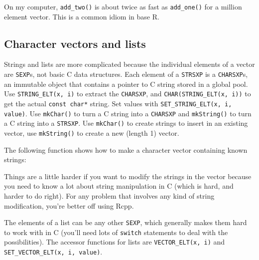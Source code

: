 On my computer, \texttt{add\_two()} is about twice as fast as
\texttt{add\_one()} for a million element vector. This is a common idiom
in base R.

\subsection{Character vectors and lists}

Strings and lists are more complicated because the individual elements
of a vector are \texttt{SEXP}s, not basic C data structures. Each
element of a \texttt{STRSXP} is a \texttt{CHARSXP}s, an immutable object
that contains a pointer to C string stored in a global pool. Use
\texttt{STRING\_ELT(x, i)} to extract the \texttt{CHARSXP}, and
\texttt{CHAR(STRING\_ELT(x, i))} to get the actual \texttt{const char*}
string. Set values with \texttt{SET\_STRING\_ELT(x, i, value)}. Use
\texttt{mkChar()} to turn a C string into a \texttt{CHARSXP} and
\texttt{mkString()} to turn a C string into a \texttt{STRSXP}. Use
\texttt{mkChar()} to create strings to insert in an existing vector, use
\texttt{mkString()} to create a new (length 1) vector.

The following function shows how to make a character vector containing
known strings:

\begin{Shaded}
\begin{Highlighting}[]
\StringTok{ }\NormalTok{(}\NormalTok{, }



\NormalTok{)}
\NormalTok{()}
\end{Highlighting}
\end{Shaded}

Things are a little harder if you want to modify the strings in the
vector because you need to know a lot about string manipulation in C
(which is hard, and harder to do right). For any problem that involves
any kind of string modification, you're better off using Rcpp.

The elements of a list can be any other \texttt{SEXP}, which generally
makes them hard to work with in C (you'll need lots of \texttt{switch}
statements to deal with the possibilities). The accessor functions for
lists are \texttt{VECTOR\_ELT(x, i)} and
\texttt{SET\_VECTOR\_ELT(x, i, value)}.

